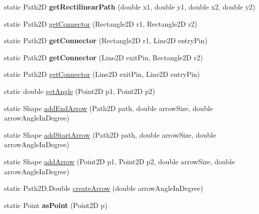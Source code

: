 \begin{DoxyCompactItemize}
\item 
\hypertarget{classairhockeyjava_1_1util_1_1_geometry_a41e477580164d9a497603a9b3e937f20}{}static Path2\+D {\bfseries get\+Rectilinear\+Path} (double x1, double y1, double x2, double y2)\label{classairhockeyjava_1_1util_1_1_geometry_a41e477580164d9a497603a9b3e937f20}

\item 
static Path2\+D \hyperlink{classairhockeyjava_1_1util_1_1_geometry_aa1af4bad701787131aac7acce273e728}{get\+Connector} (Rectangle2\+D r1, Rectangle2\+D r2)
\item 
\hypertarget{classairhockeyjava_1_1util_1_1_geometry_acd6a0eb90eeac498be159e85bc7b4ed5}{}static Path2\+D {\bfseries get\+Connector} (Rectangle2\+D r1, Line2\+D entry\+Pin)\label{classairhockeyjava_1_1util_1_1_geometry_acd6a0eb90eeac498be159e85bc7b4ed5}

\item 
\hypertarget{classairhockeyjava_1_1util_1_1_geometry_a15eb8036abd1330e955f09d862b3fc2c}{}static Path2\+D {\bfseries get\+Connector} (Line2\+D exit\+Pin, Rectangle2\+D r2)\label{classairhockeyjava_1_1util_1_1_geometry_a15eb8036abd1330e955f09d862b3fc2c}

\item 
static Path2\+D \hyperlink{classairhockeyjava_1_1util_1_1_geometry_a563dad2a2f1b2cc5ab3a7ed5a12ce133}{get\+Connector} (Line2\+D exit\+Pin, Line2\+D entry\+Pin)
\item 
static double \hyperlink{classairhockeyjava_1_1util_1_1_geometry_a3482cd64b75cdb68f0edd3312dd5870b}{get\+Angle} (Point2\+D p1, Point2\+D p2)
\item 
static Shape \hyperlink{classairhockeyjava_1_1util_1_1_geometry_ad2453dd0fb46228515b9ce36bd21d628}{add\+End\+Arrow} (Path2\+D path, double arrow\+Size, double arrow\+Angle\+In\+Degree)
\item 
static Shape \hyperlink{classairhockeyjava_1_1util_1_1_geometry_adb35da43785602cbe1e7d1834e2cdc80}{add\+Start\+Arrow} (Path2\+D path, double arrow\+Size, double arrow\+Angle\+In\+Degree)
\item 
static Shape \hyperlink{classairhockeyjava_1_1util_1_1_geometry_af74b6f040dcbce9059ae3e9c70d4f0a4}{add\+Arrow} (Point2\+D p1, Point2\+D p2, double arrow\+Size, double arrow\+Angle\+In\+Degree)
\item 
static Path2\+D.\+Double \hyperlink{classairhockeyjava_1_1util_1_1_geometry_a3c8a934bd7064eb0e5b73adddbff371c}{create\+Arrow} (double arrow\+Angle\+In\+Degree)
\item 
\hypertarget{classairhockeyjava_1_1util_1_1_geometry_ae9c74508ca50b0d4ef4c13aa22501b0c}{}static Point {\bfseries as\+Point} (Point2\+D p)\label{classairhockeyjava_1_1util_1_1_geometry_ae9c74508ca50b0d4ef4c13aa22501b0c}


\end{DoxyCompactItemize}

